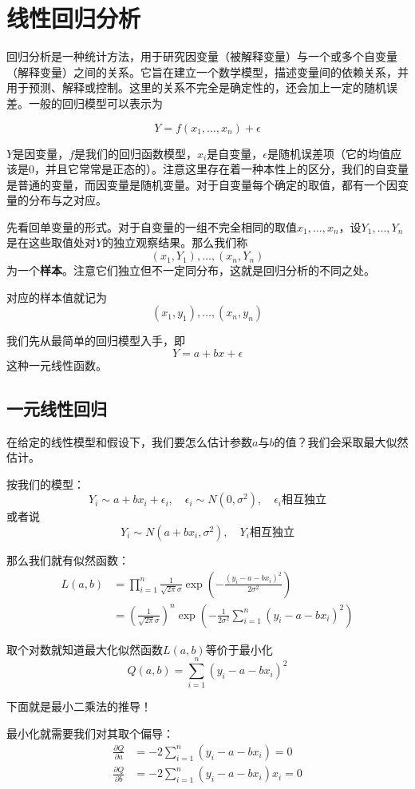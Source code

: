 \section{线性回归分析}

回归分析是一种统计方法，用于研究因变量（被解释变量）与一个或多个自变量（解释变量）之间的关系。它旨在建立一个数学模型，描述变量间的依赖关系，并用于预测、解释或控制。这里的关系不完全是确定性的，还会加上一定的随机误差。一般的回归模型可以表示为

\[
Y=f(x_1,\ldots,x_n) + \epsilon
\]

$Y$是因变量，$f$是我们的回归函数模型，$x_i$是自变量，$\epsilon$是随机误差项（它的均值应该是$0$，并且它常常是正态的）。注意这里存在着一种本性上的区分，我们的自变量是普通的变量，而因变量是随机变量。对于自变量每个确定的取值，都有一个因变量的分布与之对应。

先看回单变量的形式。对于自变量的一组不完全相同的取值$x_1,\ldots,x_n$，设$Y_1,\ldots,Y_n$是在这些取值处对$Y$的独立观察结果。那么我们称
\[
(x_1,Y_1),\ldots,(x_n,Y_n)
\]
为一个\textbf{样本}。注意它们独立但不一定同分布，这就是回归分析的不同之处。

对应的样本值就记为
\[
(x_1,y_1),\ldots,(x_n,y_n)
\]

我们先从最简单的回归模型入手，即
\[
Y=a+bx+\epsilon
\]
这种一元线性函数。

\subsection{一元线性回归}

在给定的线性模型和假设下，我们要怎么估计参数$a$与$b$的值？我们会采取最大似然估计。

按我们的模型：
\[
Y_i\sim a +bx_i +\epsilon_i, \quad \epsilon_i \sim N(0,\sigma^2),\quad \epsilon_i \text{相互独立}
\]
或者说
\[
Y_i\sim N(a+bx_i,\sigma^2),\quad Y_i \text{相互独立}
\]

那么我们就有似然函数：
\begin{align*}
L(a,b) &= \prod_{i=1}^n \frac{1}{\sqrt{2\pi}\sigma}\exp\left(-\frac{(y_i-a-bx_i)^2}{2\sigma^2}\right)\\
&= \left(\frac{1}{\sqrt{2\pi}\sigma}\right)^n \exp \left(-\frac{1}{2\sigma^2}\sum_{i=1}^n(y_i-a-bx_i)^2 \right)
\end{align*}

取个对数就知道最大化似然函数$L(a,b)$等价于最小化
\[
Q(a,b)=\sum_{i=1}^n(y_i-a-bx_i)^2
\]

下面就是最小二乘法的推导！

最小化就需要我们对其取个偏导：
\begin{align*}
\frac{\partial Q}{\partial a} &= -2\sum_{i=1}^n(y_i-a-bx_i) = 0\\
\frac{\partial Q}{\partial b} &= -2\sum_{i=1}^n(y_i-a-bx_i)x_i = 0\\
\end{align*}

